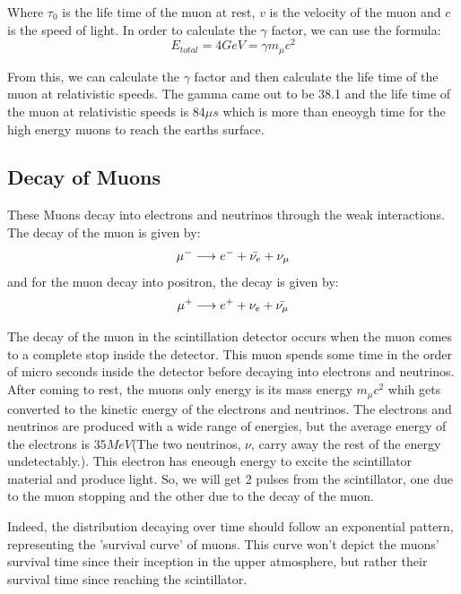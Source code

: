 \documentclass{article}
\begin{document}
\begin{multicols}{2}
Where $\tau_{0}$ is the life time of the muon at rest, $v$ is the velocity of the muon and $c$ is the speed of light. In order to calculate the $\gamma$ factor, we can use the formula:
\begin{equation}
    E_{total} = 4GeV = \gamma m_{\mu}c^2
\end{equation}

From this, we can calculate the $\gamma$ factor and then calculate the life time of the muon at relativistic speeds. The gamma came out to be 38.1 and the life time of the muon at relativistic speeds is $ 84 \mu s$ which is more than eneoygh time for the high energy muons to reach the earths surface.


\subsection{Decay of Muons}

These Muons decay into electrons and neutrinos through the weak interactions. The decay of the muon is given by:
\begin{equation}
    \mu^{-} \longrightarrow e^{-} + \Bar{\nu_{e}} + \nu_{\mu}
\end{equation}
and for the muon decay into positron, the decay is given by:
\begin{equation}
    \mu^{+} \longrightarrow e^{+} + \nu_{e} + \Bar{\nu_{\mu}}
\end{equation}


The decay of the muon in the scintillation detector occurs when the muon comes to a complete stop inside the detector. This muon spends some time in the order of micro seconds inside the detector before decaying into electrons and neutrinos. After coming to rest, the muons only energy is its mass energy $m_\mu c^2$ whih gets converted to the kinetic energy of the electrons and neutrinos. The electrons and neutrinos are produced with a wide range of energies, but the average energy of the electrons is $35 MeV$(The two neutrinos, $\nu$, carry away the rest of the energy undetectably.). This electron has eneough energy to excite the scintillator material and produce light. So, we will get 2 pulses from the scintillator, one due to the muon stopping and the other due to the decay of the muon.


Indeed, the distribution decaying over time should follow an exponential pattern, representing the 'survival curve' of muons. This curve won't depict the muons' survival time since their inception in the upper atmosphere, but rather their survival time since reaching the scintillator.


\end{multicols}
\end{document}
